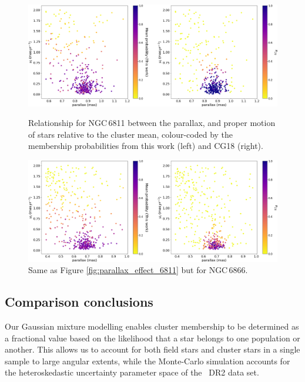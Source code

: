 \begin{figure}[tpb]
    \centering
    \includegraphics[width=\linewidth]{Chapter4/NGC6811_CG_comparison_parallax_all.png}
    \caption[Impact of parallax inclusion in membership analysis - NGC\,6811]{Relationship for NGC\,6811 between the parallax, and proper motion of stars relative to the cluster mean, colour-coded by the membership probabilities from this work (left) and CG18 (right).}
    \label{fig:parallax_effect_6811}
    \vspace{0.5cm}
    \includegraphics[width=\linewidth]{Chapter4/NGC6866_CG_comparison_parallax_all.png}
    \caption[Impact of parallax inclusion in membership analysis - NGC\,6866]{Same as Figure \ref{fig:parallax_effect_6811} but for NGC\,6866.}
    \label{fig:parallax_effect_6866}
\end{figure}

\subsection{Comparison conclusions}

Our Gaussian mixture modelling enables cluster membership to be determined as a fractional value based on the likelihood that a star belongs to one population or another. This allows us to account for both field stars and cluster stars in a single sample to large angular extents, while the Monte-Carlo simulation accounts for the heteroskedastic uncertainty parameter space of the \Gaia~DR2 data set.

